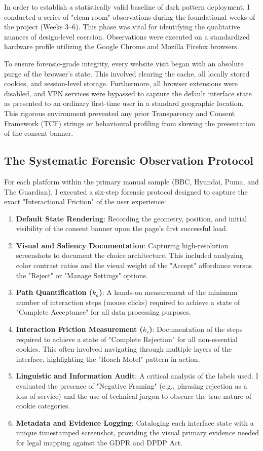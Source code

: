 \documentclass[12pt,a4paper]{report}
\begin{document}
In order to establish a statistically valid baseline of dark pattern deployment, I conducted a series of "clean-room" observations during the foundational weeks of the project (Weeks 3–6). This phase was vital for identifying the qualitative nuances of design-level coercion. Observations were executed on a standardized hardware profile utilizing the Google Chrome and Mozilla Firefox browsers. 

To ensure forensic-grade integrity, every website visit began with an absolute purge of the browser's state. This involved clearing the cache, all locally stored cookies, and session-level storage. Furthermore, all browser extensions were disabled, and VPN services were bypassed to capture the default interface state as presented to an ordinary first-time user in a standard geographic location. This rigorous environment prevented any prior Transparency and Consent Framework (TCF) strings or behavioural profiling from skewing the presentation of the consent banner.

\subsection{The Systematic Forensic Observation Protocol}

For each platform within the primary manual sample (BBC, Hyundai, Puma, and The Guardian), I executed a six-step forensic protocol designed to capture the exact "Interactional Friction" of the user experience:

\begin{enumerate}[leftmargin=1.5cm]
\item \textbf{Default State Rendering}: Recording the geometry, position, and initial visibility of the consent banner upon the page's first successful load.
\item \textbf{Visual and Saliency Documentation}: Capturing high-resolution screenshots to document the choice architecture. This included analyzing color contrast ratios and the visual weight of the "Accept" affordance versus the "Reject" or "Manage Settings" options.
\item \textbf{Path Quantification ($k_a$)}: A hands-on measurement of the minimum number of interaction steps (mouse clicks) required to achieve a state of "Complete Acceptance" for all data processing purposes.
\item \textbf{Interaction Friction Measurement ($k_r$)}: Documentation of the steps required to achieve a state of "Complete Rejection" for all non-essential cookies. This often involved navigating through multiple layers of the interface, highlighting the "Roach Motel" pattern in action.
\item \textbf{Linguistic and Information Audit}: A critical analysis of the labels used. I evaluated the presence of "Negative Framing" (e.g., phrasing rejection as a loss of service) and the use of technical jargon to obscure the true nature of cookie categories.
\item \textbf{Metadata and Evidence Logging}: Cataloging each interface state with a unique timestamped screenshot, providing the visual primary evidence needed for legal mapping against the GDPR and DPDP Act.
\end{enumerate}
\end{document}
